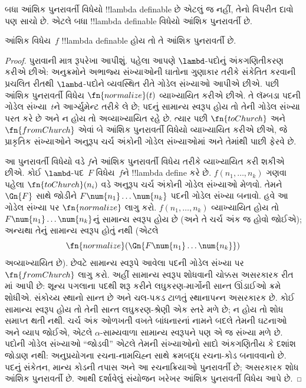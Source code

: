 \documentclass[../../../include/open-logic-section]{subfiles}
\begin{document}

બધા આંશિક પુનરાવર્તી વિધેયો !!{lambda definable}
છે એટલું જ નહીં, તેનો વિપરીત દાવો પણ સાચો છે.
એટલે બધા !!{lambda definable} વિધેયો આંશિક
પુનરાવર્તી છે.

\begin{thm}
   આંશિક વિધેય~$f$
  !!{lambda definable} હોય તો તે આંશિક પુનરાવર્તી છે.
\end{thm}

\begin{proof}
  પુરાવાની માત્ર રૂપરેખા આપીશું. પહેલા આપણે
  $\lambd$-પદોનું અંકગણિતીકરણ કરીએ છીએ: અનુક્રમોને
  અભાજ્ય સંખ્યાઓની ઘાતોના ગુણાકાર તરીકે સંકેતિત કરવાની પ્રચલિત રીતથી
  $\lambd$-પદોને વ્યવસ્થિત રીતે ગોડેલ સંખ્યાઓ આપીએ
  છીએ. પછી આંશિક પુનરાવર્તી વિધેય
  $\fn{normalize}(t)$ વ્યાખ્યાયિત કરીએ છીએ. તે
  લૅમ્બડા પદની ગોડેલ સંખ્યા~$t$ને આર્ગ્યુમેન્ટ
  તરીકે લે છે; પદનું સામાન્ય સ્વરૂપ હોય તો તેની
  ગોડેલ સંખ્યા પરત કરે છે અને ન હોય તો
  અવ્યાખ્યાયિત રહે છે. ત્યાર પછી $\fn{toChurch}$
  અને $\fn{fromChurch}$ એવાં બે આંશિક પુનરાવર્તી
  વિધેયો વ્યાખ્યાયિત કરીએ છીએ, જે પ્રાકૃતિક સંખ્યાઓને
  અનુરૂપ ચર્ચ અંકોની ગોડેલ સંખ્યાઓમાં અને તેમાંથી
  પાછી ફેરવે છે.

  આ પુનરાવર્તી વિધેયો વડે $f$ને આંશિક પુનરાવર્તી
  વિધેય તરીકે વ્યાખ્યાયિત કરી શકીએ છીએ. કોઈ
  $\lambd$-પદ~$F$ વિધેય~$f$ને !!{lambda define}
  કરે છે. $f(n_1, \dots, n_k)$ ગણવા પહેલા
  $\fn{toChurch}(n_i)$ વડે અનુરૂપ ચર્ચ અંકોની
  ગોડેલ સંખ્યાઓ મેળવો. તેમને $\Gn{F}$ સાથે જોડીને
  $F \num{n_1}\dots\num{n_k}$ પદની ગોડેલ સંખ્યા
  બનાવો. હવે આ ગોડેલ સંખ્યા પર $\fn{normalize}$
  લાગુ કરો. $f(n_1, \dots, n_k)$ વ્યાખ્યાયિત હોય
  તો $F \num{n_1}\dots\num{n_k}$નું સામાન્ય સ્વરૂપ
  હોય છે (અને તે ચર્ચ અંક જ હોવો જોઈએ); અન્યથા
  તેનું સામાન્ય સ્વરૂપ હોતું નથી (એટલે
  \[\fn{normalize}(\Gn{F\num{n_1}\dots\num{n_k}})\]
  અવ્યાખ્યાયિત છે). છેવટે સામાન્ય સ્વરૂપે આવેલા
  પદની ગોડેલ સંખ્યા પર $\fn{fromChurch}$ લાગુ કરો.
  અહીં સામાન્ય સ્વરૂપ શોધવાની ચોક્કસ અસરકારક રીત
  માં આપી છે:
  શૂન્ય પગલાના પદથી શરૂ કરીને લઘુકરણ-માર્ગોની સાન્ત
  ઊંડાઈઓ ક્રમે શોધીએ. સંકોચ્ય સ્થાનો સાન્ત છે અને
  ચલ-પકડ ટાળતું સ્થાનાપન્ન અસરકારક છે. કોઈ સામાન્ય
  સ્વરૂપ હોય તો તેની સાન્ત લઘુકરણ-શ્રેણી એક સ્તરે મળે છે;
  ન હોય તો શોધ સમાપ્ત થતી નથી.
  ચર્ચ અંક ઓળખતી વખતે બાંધનારનાં નામને બદલે તેમની
  ઘટનાઓ અને વ્યાપ જોઈએ, એટલે $\alpha$-સામ્યવાળા
  સામાન્ય સ્વરૂપને પણ એ જ સંખ્યા મળે છે.
  પદોની ગોડેલ સંખ્યાઓ “જોડવી” એટલે તેમની સંખ્યાઓનો
  સાદો અંકગણિતીય કે દશાંશ જોડાણ નથી: અનુપ્રયોગના
  રચના-નામચિહ્ન સાથે ક્રમબદ્ધ રચના-કોડ બનાવવાનો છે.
  પદનું સંકેતન, માન્ય કોડની તપાસ અને આ રચનાક્રિયાઓ
  પુનરાવર્તી છે; અસરકારક શોધ આંશિક પુનરાવર્તી છે.
  આથી દર્શાવેલું સંયોજન ખરેખર આંશિક પુનરાવર્તી વિધેય આપે છે.
\end{proof}
\end{document}
